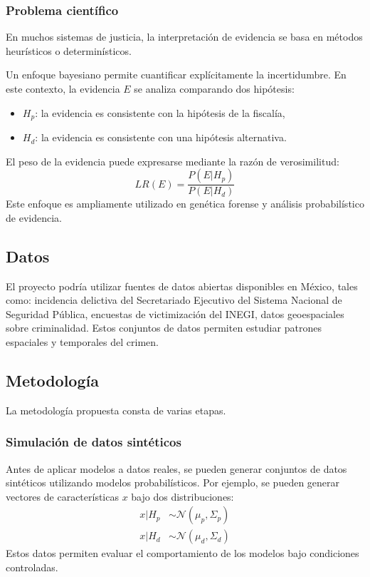 \documentclass[a4paper,10pt,oneside]{article}
\begin{document}
\subsubsection*{Problema cient\'ifico}

En muchos sistemas de justicia, la interpretaci\'on de evidencia se basa en m\'etodos heur\'isticos o determin\'isticos.

Un enfoque bayesiano permite cuantificar expl\'icitamente la incertidumbre. En este contexto, la evidencia $E$ se analiza comparando dos hip\'otesis:

\begin{itemize}
\item $H_p$: la evidencia es consistente con la hip\'otesis de la fiscal\'ia,
\item $H_d$: la evidencia es consistente con una hip\'otesis alternativa.
\end{itemize}

El peso de la evidencia puede expresarse mediante la raz\'on de verosimilitud:
\begin{equation}
LR(E) = \frac{P(E|H_p)}{P(E|H_d)}
\end{equation}
Este enfoque es ampliamente utilizado en gen\'etica forense y an\'alisis probabil\'istico de evidencia.

\subsection{Datos}

El proyecto podr\'ia utilizar fuentes de datos abiertas disponibles en M\'exico, tales como: incidencia delictiva del Secretariado Ejecutivo del Sistema Nacional de Seguridad P\'ublica, encuestas de victimizaci\'on del INEGI, datos geoespaciales sobre criminalidad. Estos conjuntos de datos permiten estudiar patrones espaciales y temporales del crimen.

\subsection{Metodolog\'ia}

La metodolog\'ia propuesta consta de varias etapas.

\subsubsection*{Simulaci\'on de datos sint\'eticos}

Antes de aplicar modelos a datos reales, se pueden generar conjuntos de datos sint\'eticos utilizando modelos probabil\'isticos. Por ejemplo, se pueden generar vectores de caracter\'isticas $x$ bajo dos distribuciones:
\begin{align}
x | H_p &\sim \mathcal{N}(\mu_p,\Sigma_p) \\
x | H_d &\sim \mathcal{N}(\mu_d,\Sigma_d)
\end{align}
Estos datos permiten evaluar el comportamiento de los modelos bajo condiciones controladas.
\end{document}
